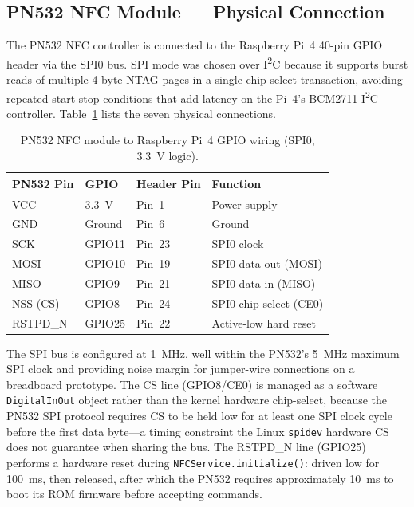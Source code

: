 \documentclass[pdflatex,sn-vancouver-num]{sn-jnl}%
\theoremstyle{thmstyleone}%
\theoremstyle{thmstyletwo}%
\theoremstyle{thmstylethree}%
\begin{document}
\subsection{PN532 NFC Module --- Physical Connection}

The PN532 NFC controller is connected to the Raspberry Pi~4 40-pin GPIO header
via the SPI0 bus. SPI mode was chosen over I\textsuperscript{2}C because it
supports burst reads of multiple 4-byte NTAG pages in a single chip-select
transaction, avoiding repeated start-stop conditions that add latency on the
Pi~4's BCM2711 I\textsuperscript{2}C controller. Table~\ref{tab:pn532_wiring}
lists the seven physical connections.

\begin{table}[t]
\caption{PN532 NFC module to Raspberry Pi~4 GPIO wiring (SPI0, 3.3~V logic).}
\label{tab:pn532_wiring}%
\begin{tabular}{|l|l|l|l|}
  \hline
  PN532 Pin & GPIO & Header Pin & Function \\
  \hline
  VCC      & 3.3~V   & Pin~1  & Power supply \\
  GND      & Ground  & Pin~6  & Ground \\
  SCK      & GPIO11  & Pin~23 & SPI0 clock \\
  MOSI     & GPIO10  & Pin~19 & SPI0 data out (MOSI) \\
  MISO     & GPIO9   & Pin~21 & SPI0 data in (MISO) \\
  NSS (CS) & GPIO8   & Pin~24 & SPI0 chip-select (CE0) \\
  RSTPD\_N & GPIO25  & Pin~22 & Active-low hard reset \\
  \hline
\end{tabular}
\end{table}

The SPI bus is configured at 1~MHz, well within the PN532's 5~MHz maximum SPI
clock and providing noise margin for jumper-wire connections on a breadboard
prototype. The CS line (GPIO8/CE0) is managed as a software
\texttt{DigitalInOut} object rather than the kernel hardware chip-select,
because the PN532 SPI protocol requires CS to be held low for at least one SPI
clock cycle before the first data byte---a timing constraint the Linux
\texttt{spidev} hardware CS does not guarantee when sharing the bus. The
RSTPD\_N line (GPIO25) performs a hardware reset during
\texttt{NFCService.initialize()}: driven low for 100~ms, then released, after
which the PN532 requires approximately 10~ms to boot its ROM firmware before
accepting commands.
\end{document}
